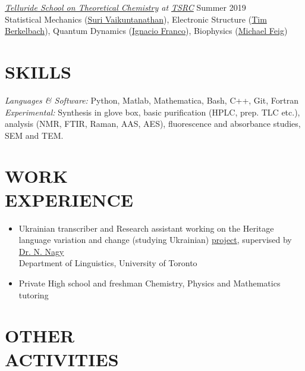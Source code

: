 \documentclass[9pt, margin]{res}
\begin{document}
\begin{resume}
{\sl \href{http://vaikuntanathan-group.uchicago.edu/TSRC/telluride2019.html}{Telluride School on Theoretical Chemistry} at \href{https://www.telluridescience.org/schools/tellurideschoolontheoreticalchemistry}{TSRC}} \hfill Summer 2019 \\
Statistical Mechanics (\href{https://chemistry.uchicago.edu/faculty/suri-vaikuntanathan}{Suri Vaikuntanathan}), Electronic Structure (\href{https://chem.columbia.edu/people/faculty/timothy-berkelbach/}{Tim Berkelbach}), Quantum Dynamics (\href{http://www.sas.rochester.edu/chm/people/faculty/franco-ignacio/index.html}{Ignacio Franco}), Biophysics (\href{https://bmb.natsci.msu.edu/faculty/michael-feig/}{Michael Feig})


\section{SKILLS} 

{\sl Languages \& Software:} Python, Matlab, Mathematica, Bash, C++, Git, Fortran\\
{\sl Experimental:} Synthesis in glove box, basic purification (HPLC, prep. TLC etc.), analysis (NMR, FTIR, Raman, AAS, AES), fluorescence and absorbance studies, SEM and TEM.


\section{WORK \\ EXPERIENCE} 

\begin{itemize}
\item Ukrainian transcriber and Research assistant working on the Heritage language variation and change (studying Ukrainian) \href{http://projects.chass.utoronto.ca/ngn/HLVC/0_0_home.php}{project}, supervised by \href{http://individual.utoronto.ca/ngn/}{Dr. N. Nagy}\\ Department of Linguistics, University of Toronto 
\item Private High school and freshman Chemistry, Physics and Mathematics tutoring
\end{itemize}

\section{OTHER \\ ACTIVITIES} 


\end{resume}
\end{document}
